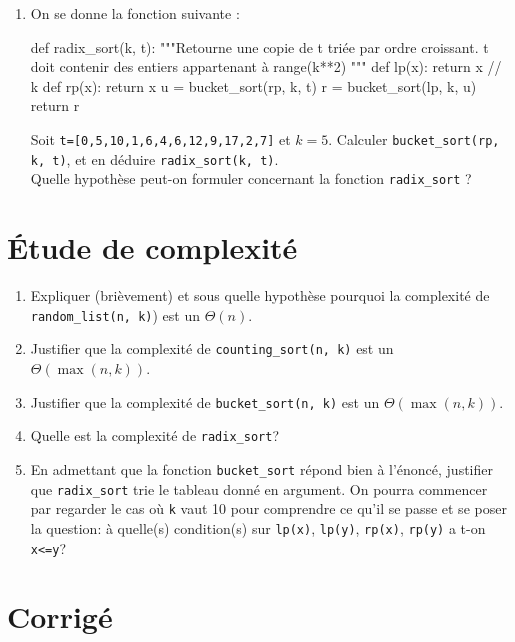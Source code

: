 \begin{enumerate}
\item On se donne la fonction suivante :\\

\begin{python}
def radix_sort(k, t):
    """Retourne une copie de t triée par ordre croissant.
    t doit contenir des entiers appartenant à range(k**2)
    """
    def lp(x):
        return x // k
    def rp(x):
        return x %
    u = bucket_sort(rp, k, t)
    r = bucket_sort(lp, k, u)
    return r
\end{python}

Soit \texttt{t=[0,5,10,1,6,4,6,12,9,17,2,7]} et $k=5$. Calculer \texttt{bucket\_sort(rp, k, t)}, et en déduire 
\texttt{radix\_sort(k, t)}.\\
Quelle hypothèse peut-on formuler concernant la fonction \texttt{radix\_sort} ?

  \setcounter{saveenum}{\value{enumi}}
\end{enumerate}

\section{Étude de complexité}

\begin{enumerate}
 \setcounter{enumi}{\value{saveenum}}
\item  Expliquer (brièvement)  et  sous quelle  hypothèse pourquoi  la
  complexité de \texttt{random\_list(n, k)}) est un $\Theta(n)$.
\item Justifier que la complexité de \texttt{counting\_sort(n, k)} est un
  $\Theta(\max(n, k))$.
\item Justifier que la complexité de \texttt{bucket\_sort(n, k)} est un
  $\Theta(\max(n, k))$.
\item Quelle est la complexité de \texttt{radix\_sort}?
\item 
En admettant que la fonction \texttt{bucket\_sort} répond bien à l'énoncé,
justifier que \texttt{radix\_sort} trie le tableau donné en argument. On
pourra commencer par regarder le cas où \texttt{k} vaut 10 pour comprendre
ce qu'il se passe et se poser la question: à quelle(s) condition(s)
sur \texttt{lp(x)}, \texttt{lp(y)}, \texttt{rp(x)}, \texttt{rp(y)} a t-on \texttt{x<=y}?
\end{enumerate}

\fi

\ifprof
\section*{Corrigé }


